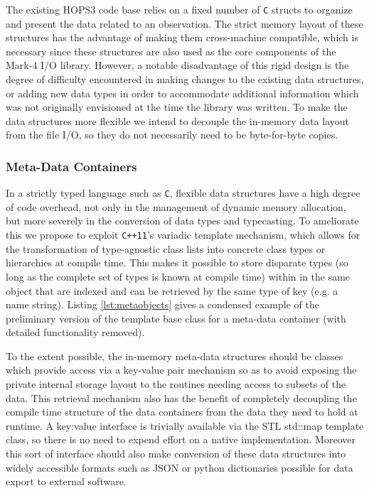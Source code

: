 \documentclass[hidelinks]{article}
\let\Oldsubsubsection\subsubsection
\renewcommand{\subsubsection}{\FloatBarrier\Oldsubsubsection}
\begin{document}
The existing HOPS3 code base relies on a fixed number of \texttt{C} structs to organize and present the data related to an observation. The strict memory layout of these structures has the advantage of making them cross-machine compatible, which is necessary since these structures are also used as the core components of the Mark-4 I/O library. However, a notable disadvantage of this rigid design is the degree of difficulty encountered in making changes to the existing data structures, or adding new data types in order to accommodate additional information which was not originally envisioned at the time the library was written. To make the data structures more flexible we intend to decouple the in-memory data layout from the file I/O, so they do not necessarily need to be byte-for-byte copies.

\subsubsection{Meta-Data Containers}

In a strictly typed language such as \texttt{C}, flexible data structures have a high degree of code overhead, not only in the management of dynamic memory allocation, but more severely in the conversion of data types and typecasting. To ameliorate this we propose to exploit \texttt{C++11}'s variadic template mechanism, which allows for the transformation of type-agnostic class lists into concrete class types or hierarchies at compile time. This makes it possible to store disparate types (so long as the complete set of types is known at compile time) within in the same object that are indexed and can be retrieved by the same type of key (e.g. a name string). Listing \ref{lst:metaobjects} gives a condensed example of the preliminary version of the template base class for a meta-data container (with detailed functionality removed).



To the extent possible, the in-memory meta-data structures should be classes which provide access via a key-value pair mechanism so as to avoid exposing the private internal storage layout to the routines needing access to subsets of the data. This retrieval mechanism also has the benefit of completely decoupling the compile
time structure of the data containers from the data they need to hold at runtime. A key:value interface is trivially available via the STL std::map template class,
so there is no need to expend effort on a native implementation. Moreover this sort of interface should also make conversion of these data structures into widely accessible formats such as JSON or python dictionaries possible for data export to external software.
\end{document}
